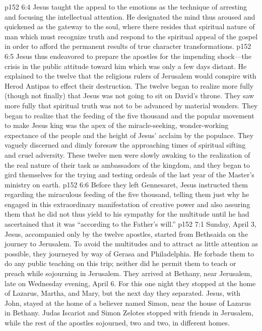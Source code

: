 \pc \vs p152 6:4 Jesus taught the appeal to the emotions as the technique of arresting and focusing the intellectual attention. He designated the mind thus aroused and quickened as the gateway to the soul, where there resides that spiritual nature of man which must recognize truth and respond to the spiritual appeal of the gospel in order to afford the permanent results of true character transformations.
\vs p152 6:5 Jesus thus endeavored to prepare the apostles for the impending shock---the crisis in the public attitude toward him which was only a few days distant. He explained to the twelve that the religious rulers of Jerusalem would conspire with Herod Antipas to effect their destruction. The twelve began to realize more fully (though not finally) that Jesus was not going to sit on David’s throne. They saw more fully that spiritual truth was not to be advanced by material wonders. They began to realize that the feeding of the five thousand and the popular movement to make Jesus king was the apex of the miracle\hyp{}seeking, wonder\hyp{}working expectance of the people and the height of Jesus’ acclaim by the populace. They vaguely discerned and dimly foresaw the approaching times of spiritual sifting and cruel adversity. These twelve men were slowly awaking to the realization of the real nature of their task as ambassadors of the kingdom, and they began to gird themselves for the trying and testing ordeals of the last year of the Master’s ministry on earth.
\pc \vs p152 6:6 Before they left Gennesaret, Jesus instructed them regarding the miraculous feeding of the five thousand, telling them just why he engaged in this extraordinary manifestation of creative power and also assuring them that he did not thus yield to his sympathy for the multitude until he had ascertained that it was “according to the Father’s will.”
\vs p152 7:1 Sunday, April 3, Jesus, accompanied only by the twelve apostles, started from Bethsaida on the journey to Jerusalem. To avoid the multitudes and to attract as little attention as possible, they journeyed by way of Gerasa and Philadelphia. He forbade them to do any public teaching on this trip; neither did he permit them to teach or preach while sojourning in Jerusalem. They arrived at Bethany, near Jerusalem, late on Wednesday evening, April 6. For this one night they stopped at the home of Lazarus, Martha, and Mary, but the next day they separated. Jesus, with John, stayed at the home of a believer named Simon, near the house of Lazarus in Bethany. Judas Iscariot and Simon Zelotes stopped with friends in Jerusalem, while the rest of the apostles sojourned, two and two, in different homes.
